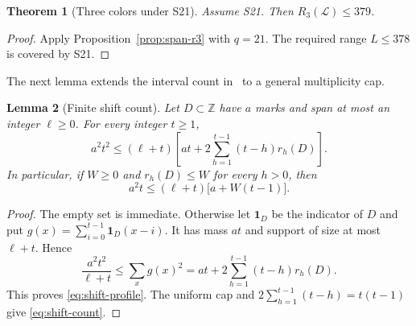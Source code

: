 \documentclass[11pt,a4paper]{article}
\newtheorem{theorem}{Theorem}[section]
\newtheorem{lemma}[theorem]{Lemma}
\theoremstyle{definition}
\newcommand{\Lconf}{\mathcal L}
\newcommand{\Z}{\mathbb Z}
\newcommand{\ind}{\mathbf1}
\numberwithin{equation}{section}
\begin{document}
\begin{theorem}[Three colors under S21]\label{thm:s21three}
Assume S21. Then $R_3(\Lconf)\le379$.
\end{theorem}
\begin{proof}
Apply Proposition~\ref{prop:span-r3} with $q=21$. The required range $L\le378$ is covered by S21.
\end{proof}

The next lemma extends the interval count in~\cite{MSY25} to a general multiplicity cap.
\begin{lemma}[Finite shift count]\label{lem:shift}
Let $D\subset\Z$ have $a$ marks and span at most an integer $\ell\ge0$. For every integer $t\ge1$,
\begin{equation}\label{eq:shift-profile}
a^2t^2\le(\ell+t)\left[at+2\sum_{h=1}^{t-1}(t-h)r_h(D)\right].
\end{equation}
In particular, if $W\ge0$ and $r_h(D)\le W$ for every $h>0$, then
\begin{equation}\label{eq:shift-count}
a^2t\le(\ell+t)\bigl[a+W(t-1)\bigr].
\end{equation}
\end{lemma}
\begin{proof}
The empty set is immediate. Otherwise let $\ind_D$ be the indicator of $D$ and put $g(x)=\sum_{i=0}^{t-1}\ind_D(x-i)$. It has mass $at$ and support of size at most $\ell+t$. Hence
\[
\frac{a^2t^2}{\ell+t}\le\sum_x g(x)^2
=at+2\sum_{h=1}^{t-1}(t-h)r_h(D).
\]
This proves \eqref{eq:shift-profile}. The uniform cap and $2\sum_{h=1}^{t-1}(t-h)=t(t-1)$ give \eqref{eq:shift-count}.
\end{proof}
\end{document}
